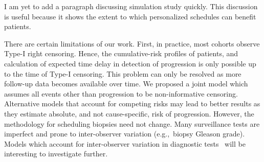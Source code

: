 I am yet to add a paragraph discussing simulation study quickly. This discussion is useful because it shows the extent to which personalized schedules can benefit patients.

There are certain limitations of our work. First, in practice, most cohorts observe Type-I right censoring. Hence, the cumulative-risk profiles of patients, and calculation of expected time delay in detection of progression is only possible up to the time of Type-I censoring. This problem can only be resolved as more follow-up data becomes available over time. We proposed a joint model which assumes all events other than progression to be non-informative censoring. Alternative models that account for competing risks may lead to better results as they estimate absolute, and not cause-specific, risk of progression. However, the methodology for scheduling biopsies need not change. Many surveillance tests are imperfect and prone to inter-observer variation (e.g.,~biopsy Gleason grade). Models which account for inter-observer variation in diagnostic tests~\citep{balasubramanian2003estimation} will be interesting to investigate further.









